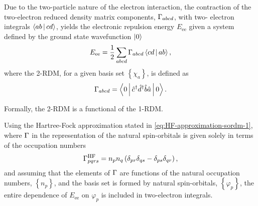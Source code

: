 Due to the two-particle nature of the electron interaction, the contraction of 
the two-electron reduced density matrix components, $\sordm_{abcd}$, with two-
electron integrals $ \Braket{ab | cd}$, yields the electronic repulsion energy 
$E_{\text{ee}}$ given a system defined by the ground state wavefunction $ \Ket{0}$
\begin{equation} \label{eq:Eee-as-function-of-2RDM}
    E_{\text{ee}}
    =
    \frac{1}{2}
    \sum_{abcd} \sordm_{abcd} \Braket{cd | ab}
    ,
\end{equation}
where the 2-RDM, for a given basis set $\left\{ \chi_a \right\}$, is defined as 
\begin{equation}
    \sordm_{abcd} =
    \Braket{0 | \hat{c}^{\dagger} \hat{d}^{\dagger} \hat{b} \hat{a} | 0}
    .
\end{equation}

Formally, the 2-RDM is a functional of the 1-RDM. %

Using the Hartree-Fock approximation stated in \cref{eq:HF-approximation-sordm-1},
where $\sordm$ in the representation of the natural spin-orbitals is given 
solely in terms of the occupation numbers
\begin{equation}
    \sordm_{pqrs}^{\text{HF}}
    =
    n_p n_q \left( \delta_{pr} \delta_{qs} - \delta_{ps} \delta_{qr} \right)
    ,
\end{equation}
and assuming that the elements of $\sordm$ are functions of the natural 
occupation numbers, $\left\{ n_p \right\}$, and the basis set is formed by 
natural spin-orbitals, $\left\{ \varphi_p \right\}$, the entire dependence of
$E_{\text{ee}}$ on $\varphi_p$ is included in two-electron integrals.

